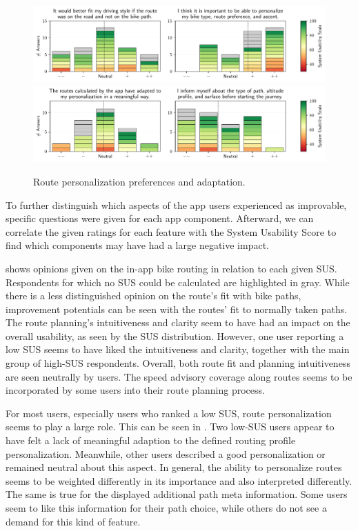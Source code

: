 \begin{figure}[t]
\caption{Route personalization preferences and adaptation.}\label{fig:route-personalization}
\includegraphics[width=\linewidth]{images/app-usability-questions-route-personalization.pdf}
\\
\includegraphics[width=\linewidth]{images/app-usability-questions-route-personalization-adaptation.pdf}
\end{figure}

To further distinguish which aspects of the app users experienced as improvable, specific questions were given for each app component. Afterward, we can correlate the given ratings for each feature with the System Usability Score to find which components may have had a large negative impact.

 shows opinions given on the in-app bike routing in relation to each given SUS. Respondents for which no SUS could be calculated are highlighted in gray. While there is a less distinguished opinion on the route's fit with bike paths, improvement potentials can be seen with the routes' fit to normally taken paths. The route planning's intuitiveness and clarity seem to have had an impact on the overall usability, as seen by the SUS distribution. However, one user reporting a low SUS seems to have liked the intuitiveness and clarity, together with the main group of high-SUS respondents. Overall, both route fit and planning intuitiveness are seen neutrally by users. The speed advisory coverage along routes seems to be incorporated by some users into their route planning process.

For most users, especially users who ranked a low SUS, route personalization seems to play a large role. This can be seen in . Two low-SUS users appear to have felt a lack of meaningful adaption to the defined routing profile personalization. Meanwhile, other users described a good personalization or remained neutral about this aspect. In general, the ability to personalize routes seems to be weighted differently in its importance and also interpreted differently. The same is true for the displayed additional path meta information. Some users seem to like this information for their path choice, while others do not see a demand for this kind of feature. 

